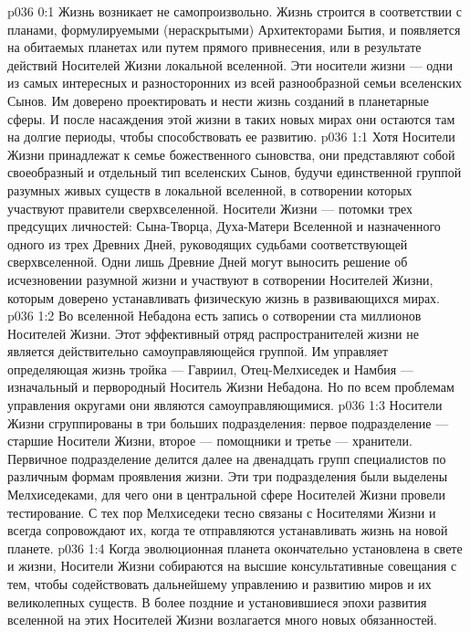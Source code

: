 \vs p036 0:1 Жизнь возникает не самопроизвольно. Жизнь строится в соответствии с планами, формулируемыми (нераскрытыми) Архитекторами Бытия, и появляется на обитаемых планетах или путем прямого привнесения, или в результате действий Носителей Жизни локальной вселенной. Эти носители жизни --- одни из самых интересных и разносторонних из всей разнообразной семьи вселенских Сынов. Им доверено проектировать и нести жизнь созданий в планетарные сферы. И после насаждения этой жизни в таких новых мирах они остаются там на долгие периоды, чтобы способствовать ее развитию.
\vs p036 1:1 Хотя Носители Жизни принадлежат к семье божественного сыновства, они представляют собой своеобразный и отдельный тип вселенских Сынов, будучи единственной группой разумных живых существ в локальной вселенной, в сотворении которых участвуют правители сверхвселенной. Носители Жизни --- потомки трех предсущих личностей: Сына\hyp{}Творца, Духа\hyp{}Матери Вселенной и назначенного одного из трех Древних Дней, руководящих судьбами соответствующей сверхвселенной. Одни лишь Древние Дней могут выносить решение об исчезновении разумной жизни и участвуют в сотворении Носителей Жизни, которым доверено устанавливать физическую жизнь в развивающихся мирах.
\vs p036 1:2 Во вселенной Небадона есть запись о сотворении ста миллионов Носителей Жизни. Этот эффективный отряд распространителей жизни не является действительно самоуправляющейся группой. Им управляет определяющая жизнь тройка --- Гавриил, Отец\hyp{}Мелхиседек и Намбия --- изначальный и первородный Носитель Жизни Небадона. Но по всем проблемам управления округами они являются самоуправляющимися.
\vs p036 1:3 Носители Жизни сгруппированы в три больших подразделения: первое подразделение --- старшие Носители Жизни, второе --- помощники и третье --- хранители. Первичное подразделение делится далее на двенадцать групп специалистов по различным формам проявления жизни. Эти три подразделения были выделены Мелхиседеками, для чего они в центральной сфере Носителей Жизни провели тестирование. С тех пор Мелхиседеки тесно связаны с Носителями Жизни и всегда сопровождают их, когда те отправляются устанавливать жизнь на новой планете.
\vs p036 1:4 Когда эволюционная планета окончательно установлена в свете и жизни, Носители Жизни собираются на высшие консультативные совещания с тем, чтобы содействовать дальнейшему управлению и развитию миров и их великолепных существ. В более поздние и установившиеся эпохи развития вселенной на этих Носителей Жизни возлагается много новых обязанностей.
